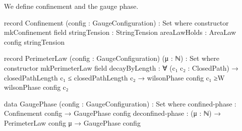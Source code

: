 \documentclass[11pt,a4paper]{book}
\begin{document}
We define confinement and the gauge phase.

\begin{code}
record Confinement (config : GaugeConfiguration) : Set where
  constructor mkConfinement
  field
    stringTension : StringTension
    areaLawHolds  : AreaLaw config stringTension

record PerimeterLaw (config : GaugeConfiguration) (μ : ℕ) : Set where
  constructor mkPerimeterLaw
  field
    decayByLength : ∀ (c₁ c₂ : ClosedPath) →
                    closedPathLength c₁ ≤ closedPathLength c₂ →
                    wilsonPhase config c₁ ≥W wilsonPhase config c₂

data GaugePhase (config : GaugeConfiguration) : Set where
  confined-phase   : Confinement config → GaugePhase config
  deconfined-phase : (μ : ℕ) → PerimeterLaw config μ → GaugePhase config
\end{code}
\end{document}
